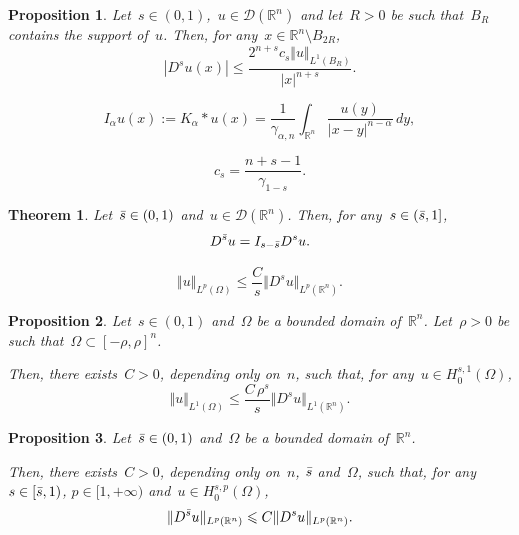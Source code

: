 \documentclass[10pt,a4paper]{amsart}
\newtheorem{proposition}{Proposition}
\newtheorem{theorem}{Theorem}
\newcommand{\Int}{\int_{\mathbb{R}^n}}
\newcommand{\R}{\mathbb{R}}
\newcommand{\bs}{\Bar{s}}
\renewcommand{\leq}{\leqslant}
\begin{document}
			\begin{proposition}\label{usasempre}
				Let~$s\in (0,1)$,~$u \in \mathcal{D}(\R^n)$ and  let~$ R >0$ be such that~$B_{ R}$ contains the support of~$u$.			
				Then, for any~$x\in\R^n\setminus B_{ 2 R}$,
				\[  |D^s u (x)| \leq  \frac{  2^{n+s} c_s  \Vert u \Vert_{L^1\left(B_{ R}\right)}} {|x|^{n+s}} . \]
			\end{proposition}

			\begin{equation}\label{riesz}
				I_{\alpha}u (x) := K_{\alpha} \ast u (x) = \frac{1}{\gamma_{\alpha,n}}\Int \frac{u(y)}{|x-y|^{n-\alpha}} \, dy,   
			\end{equation}

			\begin{equation}\label{relation}
				c_s= \frac{n+s-1}{\gamma_{1-s}}.
			\end{equation}

			\begin{theorem}\label{usacchialo}
				Let~$\Bar{s} \in (0,1)$ and~$u \in \mathcal{D}(\R^n)$. Then, for any~$s \in (\bs,1]$,
				\begin{equation}\label{imp}
					D^{\bs} u= I_{s-\bs} D^s u.
				\end{equation}
			\end{theorem}

		\begin{equation}\label{simn}
			\Vert u \Vert_{L^p(\Omega)} \leq \frac{C}{s} \Vert D^s u \Vert_{L^p(\R^n)}.
		\end{equation}

		\begin{proposition}\label{costa}
			Let~$s \in (0,1)$ and~$\Omega$ be a bounded domain of~$\R^n$. Let~$\rho>0$ be such that~${\Omega \subset [-\rho,\rho]^n}$.
			
			Then, there exists~$C>0$, depending only on~$n$, such that, for any~$u \in H_0^{s,1}(\Omega)$,
			\begin{equation*}
				\Vert u \Vert_{L^1(\Omega)} \leq \frac{C\,\rho^s }{s} \Vert D^s u \Vert_{L^1(\R^n)}.
			\end{equation*}
		\end{proposition}

		\begin{proposition}\label{crizzo}
		Let~$\bs \in (0,1)$ and~$\Omega$ be a bounded domain of~$\R^n$.
			
			 Then, there exists~$C>0$,
			 depending only on~$n$, $\bs$ and~$\Omega$,
			 such that, for any~$s \in [\bs,1)$, $p \in [1,+\infty)$ and~$u \in H_0^{s,p}(\Omega)$, 
			\begin{equation}\label{re}
				\Vert D^{\bs}u \Vert_{L^p(\R^n)} \leq C\Vert D^s u \Vert_{L^p(\R^n)}. 
			\end{equation}
		\end{proposition}
\end{document}
